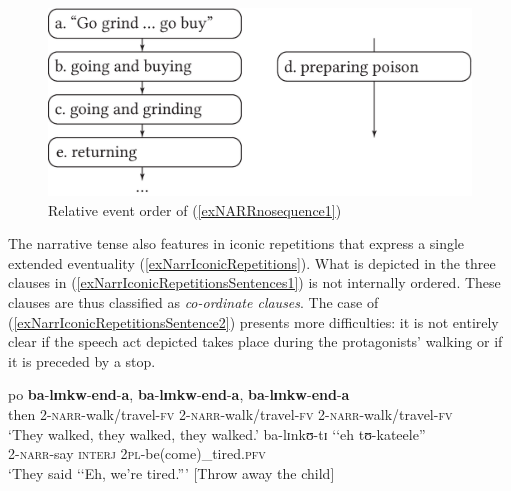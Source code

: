 \begin{figure}[hbt]
	\begin{center}
		\includegraphics{figures/GrafikRelativeOrderInLaw.png}
	\end{center}
	\caption{Relative event order of (\ref{exNARRnosequence1})}
	\label{FigureRelativeOrderInLaw}
\end{figure}

The narrative tense also features in iconic repetitions that express a single extended eventuality (\ref{exNarrIconicRepetitions}). What is depicted in the three clauses in (\ref{exNarrIconicRepetitionsSentences1}) is not internally ordered. These clauses are thus classified as \textit{co-ordinate clauses}. The case of (\ref{exNarrIconicRepetitionsSentence2}) presents more difficulties: it is not entirely clear if the speech act depicted takes place during the protagonists' walking or if it is preceded by a stop.

\begin{exe}
\ex \label{exNarrIconicRepetitions}
\begin{xlist}
\ex \label{exNarrIconicRepetitionsSentences1} \gll po \textbf{ba}-\textbf{lɪnkw}-\textbf{end}-\textbf{a}, \textbf{ba}-\textbf{lɪnkw}-\textbf{end}-\textbf{a}, \textbf{ba}-\textbf{lɪnkw}-\textbf{end}-\textbf{a}\\
then 2-\textsc{narr}-walk/travel-\textsc{fv} 2-\textsc{narr}-walk/travel-\textsc{fv} 2-\textsc{narr}-walk/travel-\textsc{fv}\\
\glt \lq They walked, they walked, they walked.'
\ex \label{exNarrIconicRepetitionsSentence2} \gll ba-lɪnkʊ-tɪ \textup{\lq\lq}eh tʊ-kateele\textup{''}\\
2-\textsc{narr}-say \phantom{\lq\lq}\textsc{interj} \textsc{2pl}-be(come)\_tired.\textsc{pfv}\\
\glt \lq They said \lq\lq Eh, we're tired.''{}' [Throw away the child]
\end{xlist}
\end{exe}

